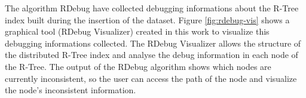 The algorithm RDebug have collected debugging informations about the R-Tree index built during the insertion of the dataset.
Figure \ref{fig:rdebug-vis} shows a graphical tool (RDebug Visualizer) created in this work to visualize this debugging informations collected.
The RDebug Visualizer allows the structure of the distributed R-Tree index and analyse the debug information in each node of the R-Tree. 
The output of the RDebug algorithm shows which nodes are currently inconsistent, so the user can access the path of the node and visualize the node's inconsistent information.    